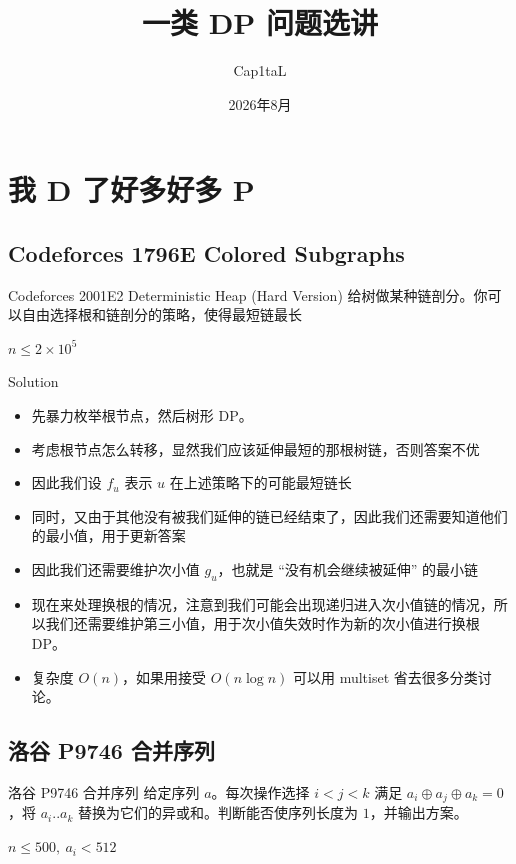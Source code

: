 ﻿\documentclass[aspectratio=169]{ctexbeamer}
\author{Cap1taL}
\title{一类 DP 问题选讲}
\date{2026年8月}
\begin{document}
\kaishu

\begin{frame}
    \titlepage
\end{frame}



\section{我 D 了好多好多 P}

\subsection{Codeforces 1796E Colored Subgraphs}

\begin{frame}{Codeforces 2001E2 Deterministic Heap (Hard Version)}
      给树做某种链剖分。你可以自由选择根和链剖分的策略，使得最短链最长
      
      $n\le 2\times 10^5$
\end{frame}

\begin{frame}{Solution}
    \begin{itemize}
        \item 先暴力枚举根节点，然后树形 DP。
        \item 考虑根节点怎么转移，显然我们应该延伸最短的那根树链，否则答案不优
        \item 因此我们设 $f_u$ 表示 $u$ 在上述策略下的可能最短链长
        \item 同时，又由于其他没有被我们延伸的链已经结束了，因此我们还需要知道他们的最小值，用于更新答案
        \item 因此我们还需要维护次小值 $g_u$，也就是 “没有机会继续被延伸” 的最小链
        \item 现在来处理换根的情况，注意到我们可能会出现递归进入次小值链的情况，所以我们还需要维护第三小值，用于次小值失效时作为新的次小值进行换根 DP。
        \item 复杂度 $O(n)$，如果用接受 $O(n\log n)$ 可以用 multiset 省去很多分类讨论。
    \end{itemize}
\end{frame}

\subsection{洛谷 P9746 合并序列}
\begin{frame}{洛谷 P9746 合并序列}
    给定序列 $a$。每次操作选择 $i<j<k$ 满足 $a_i\oplus a_j\oplus a_k=0$，将 $a_i..a_k$ 替换为它们的异或和。判断能否使序列长度为 $1$，并输出方案。
    
    $n\le 500,\ a_i<512$
\end{frame}
\end{document}

